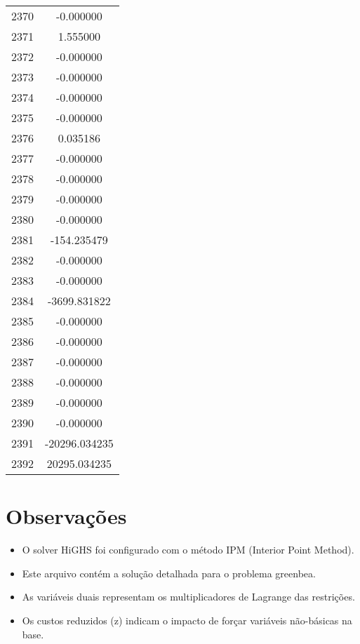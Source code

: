 \documentclass[12pt]{article}
\begin{document}
\begin{longtable}{@{}cc@{}}
2370 & -0.000000 \\
2371 & 1.555000 \\
2372 & -0.000000 \\
2373 & -0.000000 \\
2374 & -0.000000 \\
2375 & -0.000000 \\
2376 & 0.035186 \\
2377 & -0.000000 \\
2378 & -0.000000 \\
2379 & -0.000000 \\
2380 & -0.000000 \\
2381 & -154.235479 \\
2382 & -0.000000 \\
2383 & -0.000000 \\
2384 & -3699.831822 \\
2385 & -0.000000 \\
2386 & -0.000000 \\
2387 & -0.000000 \\
2388 & -0.000000 \\
2389 & -0.000000 \\
2390 & -0.000000 \\
2391 & -20296.034235 \\
2392 & 20295.034235 \\

\end{longtable}


\section{Observações}

\begin{itemize}
\item O solver HiGHS foi configurado com o método IPM (Interior Point Method).
\item Este arquivo contém a solução detalhada para o problema greenbea.
\item As variáveis duais representam os multiplicadores de Lagrange das restrições.
\item Os custos reduzidos (z) indicam o impacto de forçar variáveis não-básicas na base.
\end{itemize}
\end{document}

